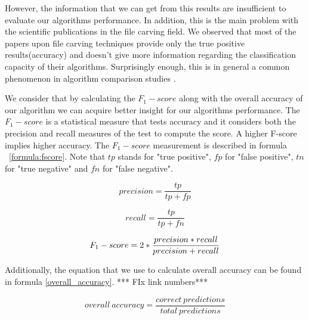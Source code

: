 However, the information that we can get from this results are insufficient to evaluate our algorithms performance. In addition, this is the main problem with the scientific publications in the file carving field. We observed that most of the papers upon file carving techniques provide only the true positive results(accuracy) and doesn't give more information regarding the classification capacity of their algorithms. Surprisingly enough, this is in general a common phenomenon in algorithm comparison studies \cite{Demsar}\cite{Sokolova}.

We consider that by calculating the ${F_1}-score$ along with the overall accuracy of our algorithm we can acquire better insight for our algorithms performance. The ${F_1}-score$  is a statistical measure that tests accuracy and it considers both the precision and recall  measures of the test to compute the score. A higher F-score implies higher accuracy. The ${F_1}-score$ measurement is described in formula ~\ref{formula:fscore}. Note that $tp$ stands for "true positive", $fp$ for "false positive", $tn$ for "true negative" and $fn$ for "false negative".




\noindent\begin{minipage}{.5\linewidth}
\small

\begin{equation}
precision = \frac{tp}{tp + fp}
\end{equation}
\end{minipage}%
\begin{minipage}{.5\linewidth}
\small
\begin{equation}
recall = \frac{tp}{tp + fn}
\end{equation}
\end{minipage}%

\begin{center}
\begin{minipage}{.5\linewidth}
\small
\begin{equation}
\newline
{F_1}-score = 2 * \frac{precision * recall}{precision + recall}
\end{equation}
\label{formula:fscore}
\end{minipage}
\end{center}

Additionally, the equation that we use to calculate overall accuracy can be found in formula \ref{overall_accuracy}. *** FIx link numbers***

\begin{center}
\noindent\begin{minipage}{.5\linewidth}
\small
\begin{equation}
overall \ accuracy = \frac{correct\ predictions}{total\ predictions}  
\end{equation}
\label{overall_accuracy}
\end{minipage}
\end{center}

